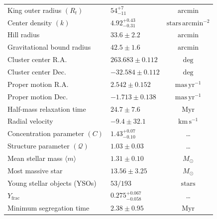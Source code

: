\documentclass{aa}
\begin{document}
\begin{table}
{\begin{tabular}{llc}
			King outer radius $(R_t)$               & $54^{+7}_{-11}$ & $\mathrm{arcmin}$                  \\
			Center density $(k)$                    & $4.92^{+0.43}_{-0.31}$   & $\mathrm{stars\,arcmin^{-2}}$      \\
			Hill radius                             & $33.6 \pm 2.2$            & $\mathrm{arcmin}$                  \\
			Gravitational bound radius              & $42.5 \pm 1.6$            & $\mathrm{arcmin}$                  \\
			Cluster center R.A.                     & $263.683 \pm 0.112$ & $\mathrm{deg}$                     \\
			Cluster center Dec.                     & $-32.584 \pm 0.112$ & $\mathrm{deg}$                     \\
			Proper motion R.A.                      & $2.542 \pm 0.152$  & $\mathrm{mas\,yr^{-1}}$            \\
			Proper motion Dec.                      & $-1.713 \pm 0.138$ & $\mathrm{mas\,yr^{-1}}$            \\
			Half-mass relaxation time               & $24.7 \pm 7.6$             & $\mathrm{Myr}$                     \\
			Radial velocity                         & $-9.4 \pm 32.1$  & $\mathrm{km\,s^{-1}}$              \\
			Concentration parameter $(C)$           & $1.43^{+0.07}_{-0.10}$    & \ldots                             \\
			Structure parameter $(\mathcal{Q})$     & $1.03 \pm 0.03$    & \ldots                             \\
			Mean stellar mass $\langle m \rangle$   & $1.31 \pm 0.10$    & $M_\odot$                          \\
			Most massive star                       & $13.56 \pm 3.25$   & $M_\odot$                          \\
			Young stellar objects (YSOs)            & $53/193$            & $\mathrm{stars}$                   \\
			$Y_{\text{frac}}$                       & $0.275^{+0.067}_{-0.058}$          & \ldots                             \\
			Minimum segregation time                & $2.38 \pm 0.95$             & $\mathrm{Myr}$                     \\ \hline
		\end{tabular}%
	}

\end{table}
\end{document}
